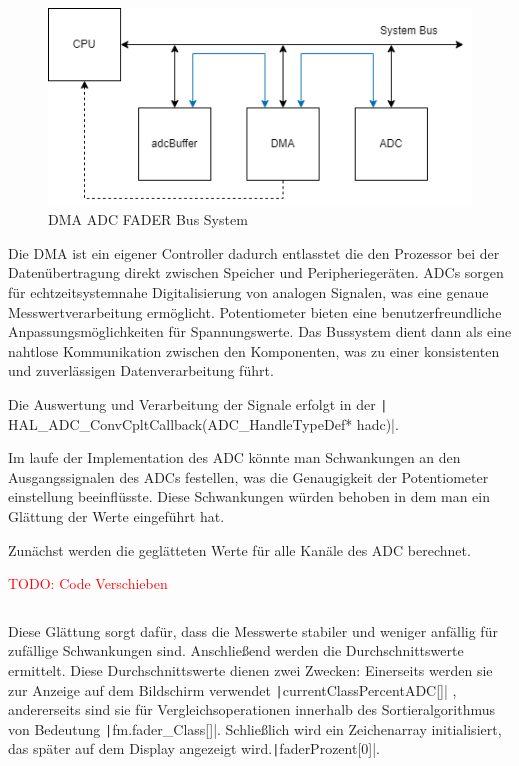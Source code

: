 \begin{figure}[H]
\centering
\includegraphics[width=1.0\textwidth]{images/08_durchfuehrung/interface/DMA_ADC_MEM.drawio.png}
\caption{DMA ADC FADER Bus System}
\label{fig:DMA ADC FADER}
\end{figure}

Die DMA ist ein eigener Controller dadurch entlasstet die den Prozessor bei der Datenübertragung direkt zwischen Speicher und Peripheriegeräten.
ADCs sorgen für echtzeitsystemnahe Digitalisierung von analogen Signalen, was eine genaue Messwertverarbeitung ermöglicht. Potentiometer bieten eine benutzerfreundliche Anpassungsmöglichkeiten für Spannungswerte. Das Bussystem dient dann als eine nahtlose Kommunikation zwischen den Komponenten, was zu einer konsistenten und zuverlässigen Datenverarbeitung führt.

\newpage
Die Auswertung und Verarbeitung der Signale erfolgt in der  \texttt| HAL_ADC_ConvCpltCallback(ADC_HandleTypeDef* hadc)|.

Im laufe der Implementation des ADC könnte man Schwankungen an den Ausgangssignalen des ADCs festellen, was die Genaugigkeit der Potentiometer einstellung beeinflüsste. Diese Schwankungen würden behoben in dem man ein Glättung der Werte eingeführt hat.

Zunächst werden die geglätteten Werte für alle Kanäle des ADC berechnet.

\textcolor{red}{TODO: Code Verschieben}

 \inputminted[firstline=121, lastline=135]{c}{../../f401_display_encoder_fader_test/Core/Src/interface.c}

Diese Glättung sorgt dafür, dass die Messwerte stabiler und weniger anfällig für zufällige Schwankungen sind. Anschließend werden die Durchschnittswerte ermittelt. Diese Durchschnittswerte dienen zwei Zwecken: Einerseits werden sie zur Anzeige auf dem Bildschirm verwendet  \texttt|currentClassPercentADC[]|
, andererseits sind sie für Vergleichsoperationen innerhalb des Sortieralgorithmus von Bedeutung  \texttt|fm.fader_Class[]|.
 Schließlich wird ein Zeichenarray initialisiert, das später auf dem Display angezeigt wird.\texttt|faderProzent[0]|.
 

